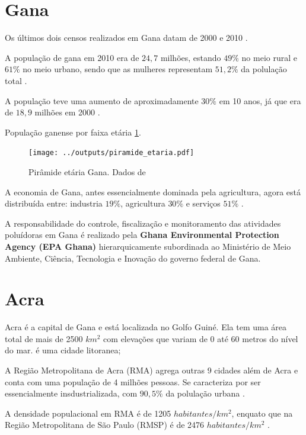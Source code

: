 \section{Gana}

Os últimos dois censos realizados em Gana datam
de 2000 \cite{censu2003} e 2010 \cite{censu2013}.

A população de gana em 2010 era de $24,7$ milhões, 
estando $49\%$ no meio rural e $61\%$ no meio urbano, 
sendo que as mulheres representam $51,2\%$ da polulação
total \cite{censu2013}.  

A população teve uma aumento de aproximadamente 
$30\%$ em 10 anos, já que era de $18,9$ milhões 
em 2000 \cite{censu2003}.

População ganense por faixa etária \ref{fig:piramedegana}. 

\begin{figure}[H]
\begin{center}
  \texttt{[image: ../outputs/piramide\_etaria.pdf]}
  \caption{Pirâmide etária Gana. Dados de \cite{censu2013} \label{fig:piramedegana}}
\end{center}
\end{figure}

A economia de Gana, antes essencialmente dominada pela agricultura, 
agora está distribuída entre: industria $19\%$, agricultura $30\%$ 
e serviços $51\%$ \cite{censu2013}. 

A responsabilidade do controle, fiscalização e monitoramento das 
atividades poluídoras em Gana é realizado pela 
\textbf{Ghana Environmental Protection Agency (EPA Ghana)} hierarquicamente
subordinada ao Ministério de Meio Ambiente, Ciência, Tecnologia e Inovação do 
governo federal de Gana.


\section{Acra}

Acra é a capital de Gana e está localizada no Golfo Guiné. Ela tem uma área 
total de mais de 2500 $km^2$ com elevações que variam de 0 até 60 metros do nível 
do mar. é uma cidade litoranea;

A Região Metropolitana de Acra (RMA) agrega outras 9 cidades
além de Acra e conta com uma população de 4 milhões pessoas. 
Se caracteriza por ser essencialmente insdustrializada, com $90,5\%$ 
da polulação urbana \cite{censu2013}.

A densidade populacional em RMA é de 1205 $habitantes/km^2$, 
enquato que na Região Metropolitana de São Paulo (RMSP) é de 
2476 $habitantes/km^2$ \cite{ibge2011}. 

